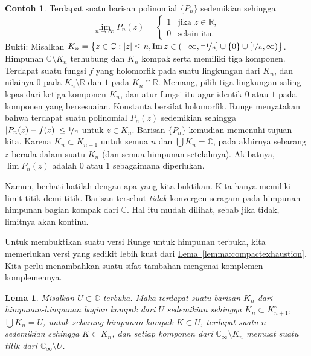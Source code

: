 \documentclass[12pt,openany]{book}
\renewcommand{\Im}{\operatorname{Im}}
\newcommand{\sabs}[1]{\lvert {#1} \rvert}
\newcommand{\C}{{\mathbb{C}}}
\newcommand{\R}{{\mathbb{R}}}
\theoremstyle{plain}
\newtheorem{lemma}[thm]{Lema}
\theoremstyle{remark}
\theoremstyle{definition}
\theoremstyle{exercise}
\theoremstyle{example}
\newtheorem{example}[thm]{Contoh}
\newcommand{\lemmaref}[1]{\hyperref[#1]{Lema~\ref*{#1}}}
\begin{document}
\begin{example}
Terdapat suatu barisan polinomial $\{ P_n \}$ sedemikian sehingga
\begin{equation*}
\lim_{n \to \infty} P_n(z)
=
\begin{cases}
1 & \text{jika } z \in \R, \\
0 & \text{selain itu.}
\end{cases}
\end{equation*}
Bukti: Misalkan $K_n = \bigl\{ z \in \C : \sabs{z} \leq n, \Im z \in
(-\infty,\nicefrac{-1}{n}] \cup \{ 0 \} \cup
[\nicefrac{1}{n},\infty) \bigr\}$.  Himpunan $\C \setminus K_n$ terhubung dan
$K_n$ kompak serta memiliki tiga komponen.  Terdapat suatu fungsi $f$
yang holomorfik pada suatu lingkungan dari $K_n$, dan nilainya $0$ pada $K_n \setminus \R$
dan $1$ pada $K_n \cap \R$.
Memang, pilih tiga lingkungan saling lepas dari ketiga komponen
$K_n$, dan atur fungsi itu agar identik $0$ atau $1$ pada komponen yang
bersesuaian.  Konstanta bersifat holomorfik.
Runge menyatakan bahwa terdapat suatu polinomial $P_n(z)$ sedemikian sehingga $\sabs{P_n(z)-f(z)}
\leq \nicefrac{1}{n}$ untuk $z \in K_n$.  Barisan $\{ P_n \}$ kemudian memenuhi
tujuan kita.  Karena $K_n \subset K_{n+1}$ untuk semua $n$ dan $\bigcup K_n = \C$,
pada akhirnya sebarang $z$ berada dalam suatu $K_n$ (dan semua himpunan setelahnya).
Akibatnya, $\lim P_n(z)$ adalah $0$ atau $1$ sebagaimana diperlukan.

Namun, berhati-hatilah dengan apa yang kita buktikan.  Kita hanya memiliki limit titik demi titik.  Barisan
tersebut \emph{tidak} konvergen seragam pada himpunan-himpunan bagian kompak dari $\C$.  Hal itu mudah dilihat,
sebab jika tidak, limitnya akan kontinu.
\end{example}

Untuk membuktikan suatu versi Runge untuk himpunan terbuka,
kita memerlukan versi yang sedikit lebih kuat dari
\lemmaref{lemma:compactexhaustion}.  Kita perlu menambahkan 
suatu sifat tambahan mengenai komplemen-komplemennya.

\begin{lemma}\label{lemma:compactexhaustion2}
Misalkan $U \subset \C$ terbuka.  Maka terdapat suatu barisan $K_n$
dari himpunan-himpunan bagian kompak dari $U$ sedemikian sehingga $K_n \subset K^\circ_{n+1}$,
$\bigcup K_n = U$,
untuk sebarang himpunan kompak $K \subset U$, terdapat suatu $n$ sedemikian sehingga $K \subset K_n$,
dan setiap komponen dari $\C_\infty \setminus K_n$ memuat suatu titik dari
$\C_\infty \setminus U$.
\end{lemma}
\end{document}
